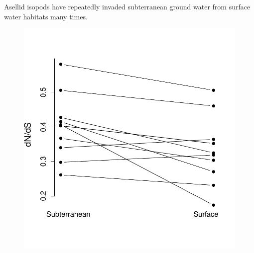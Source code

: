 Asellid isopods have repeatedly invaded subterranean ground water from
surface water habitats many times.

 \begin{figure}
 \begin{center}
 \includegraphics[width=\textwidth]{Journal_figs/drift_selection/asellid_isopods_Nes/asellid_isopods_Nes.pdf}
 \end{center}
 \caption{} \label{fig: asellid_isopods_Nes}
 \end{figure}


